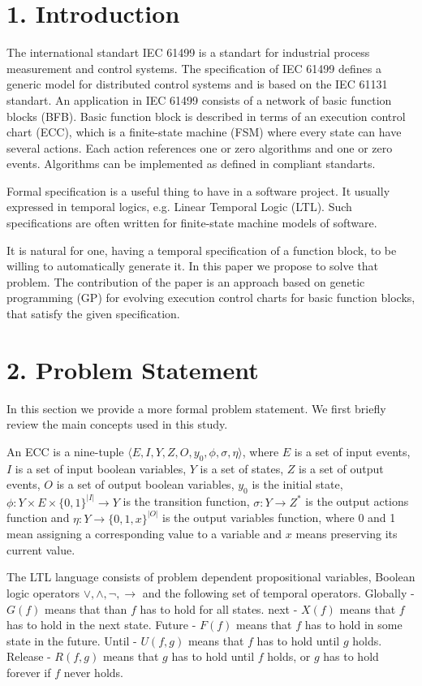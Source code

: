 \documentclass[fleqn,twocolumn]{article}
\begin{document}
\section{1. Introduction}

The international standart IEC 61499 is a standart for industrial process measurement and control systems.
The specification of IEC 61499 defines a generic model for distributed control systems and is based on the IEC 61131 standart.
An application in IEC 61499 consists of a network of basic function blocks (BFB). Basic function block is described in terms
of an execution control chart (ECC), which is a finite-state machine (FSM) where every state can have several actions.
Each action references one or zero algorithms and one or zero events. Algorithms can be implemented as defined in compliant standarts.

Formal specification is a useful thing to have in a software project. It usually expressed in temporal logics, e.g.
Linear Temporal Logic (LTL). Such specifications are often written for finite-state machine models of software.

It is natural for one, having a temporal specification of a function block, to be willing to automatically generate it.
In this paper we propose to solve that problem. The contribution of the paper is an approach based on genetic programming (GP)
for evolving execution control charts for basic function blocks, that satisfy the given specification.

\section{2. Problem Statement}

In this section we provide a more formal problem statement. We first briefly review the main concepts used in this study.

An ECC is a nine-tuple $\langle E, I, Y, Z, O, y_0, \phi, \sigma, \eta \rangle$, where $E$ is a set of input events,
$I$ is a set of input boolean variables, $Y$ is a set of states, $Z$ is a set of output events, $O$ is a set of output boolean variables,
$y_0$ is the initial state, $\phi : Y \times E \times \{0,1\}^{|I|} \rightarrow Y$ is the transition function,
$\sigma : Y \rightarrow Z^*$ is the output actions function and $\eta : Y \rightarrow \{0,1,x\}^{|O|}$ is the output variables function,
where 0 and 1 mean assigning a corresponding value to a variable and $x$ means preserving its current value.

The LTL language consists of problem dependent propositional variables, Boolean logic operators $\vee, \wedge, \lnot, \rightarrow$
and the following set of temporal operators. Globally - $G(f)$ means that than $f$ has to hold for all states. next - $X(f)$ means
that $f$ has to hold in the next state. Future - $F(f)$ means that $f$ has to hold in some state in the future. Until - $U(f, g)$
means that $f$ has to hold until $g$ holds. Release - $R(f, g)$ means that $g$ has to hold until $f$ holds, or $g$ has to hold
forever if $f$ never holds.
\end{document}
